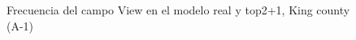 \begin{figure}[H]
    \centering
    
    \caption{Frecuencia del campo View en el modelo real y top2+1, King county (A-1)}
    \label{frecuency-top2+1-view}
\end{figure}